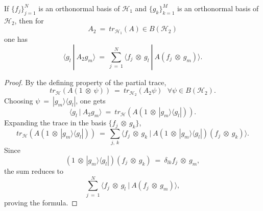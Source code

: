 \documentclass[11pt,a4paper]{article}
\begin{document}
    \begin{proposition}
    If $\{f_j\}_{j=1}^N$ is an orthonormal basis of $\mathcal{H}_1$ and $\{g_k\}_{k=1}^M$ is an orthonormal basis of $\mathcal{H}_2$, then for $$A_2\ =\ tr_{\mathcal{H}_1}(A) \in B(\mathcal{H}_2)$$ one has $$\langle g_l\ |\ A_2g_m\rangle\ =\ \sum_{j\ =\ 1}^N \langle f_j\  \otimes\ g_l\ |\ A(f_j\  \otimes\ g_m)\rangle.$$ 
    \end{proposition}
    \vspace{0.3cm} %
    \begin{proof}
    By the defining property of the partial trace, $$tr_\mathcal{H}(A(1\ \otimes\ \psi))\ =\ tr_{\mathcal{H}_2}(A_2\psi)\ \ \ \forall \psi \in B(\mathcal{H}_2).$$ Choosing $\psi\ =\ |g_m\rangle\langle g_l|$, one gets $$\langle g_l\ |\ A_2g_m\rangle\ =\ tr_\mathcal{H}(A(1\ \otimes\ |g_m\rangle\langle g_l|)).$$ Expanding the trace in the basis $\{f_j\ \otimes\ g_k\}$, $$tr_\mathcal{H}(A(1\ \otimes\ |g_m\rangle\langle g_l|))\ =\ \sum_{j,\ k}\langle f_j\ \otimes\ g_k\ |\ A(1\ \otimes\ |g_m\rangle\langle g_l|)(f_j\ \otimes\ g_k)\rangle.$$ Since $$(1\ \otimes\ |g_m\rangle\langle g_l|)(f_j\ \otimes\ g_k)\ =\ \delta_{lk}f_j\ \otimes\ g_m,$$ the sum reduces to $$\sum_{j\ =\ 1}^N\langle f_j\ \otimes\ g_l\ |\ A(f_j\ \otimes\ g_m)\rangle,$$ proving the formula.
    \end{proof}

\clearpage
\null
\clearpage
\end{document}
